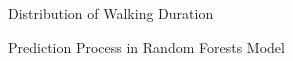 \documentclass[Journal,letterpaper]{ascelike-new}
\begin{document}
\begin{figure}[htp]
\caption{Distribution of Walking Duration}
\label{fig:3}
\centering
{}
\end{figure}
%
\begin{figure}[htp]
\caption{Prediction Process in Random Forests Model}
\label{fig:4}
\centering
{}
\end{figure}
%
\end{document}
